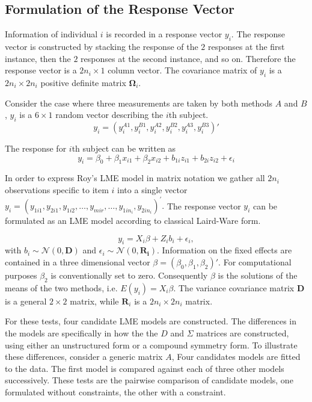 \documentclass[12pt, a4paper]{report}
\theoremstyle{plain}
\theoremstyle{definition}
\theoremstyle{remark}
\begin{document}
\subsection{Formulation of the Response Vector}
Information of individual $i$ is recorded in a response vector ${y}_{i}$. The response vector is constructed by stacking the response of the $2$ responses at the first instance, then the $2$ responses at the second instance, and so on. Therefore the response vector is a $2n_{i} \times 1$ column vector.
The covariance matrix of ${y_{i}}$ is a $2n_{i} \times 2n_{i}$ positive definite matrix $\boldsymbol{\Omega}_{i}$.

Consider the case where three measurements are taken by both methods $A$ and $B$, ${y}_{i}$ is a $6 \times 1$ random vector describing the $i$th subject.
\[
{y}_{i} = (y_{i}^{A1},y_{i}^{B1},y_{i}^{A2},y_{i}^{B2},y_{i}^{A3},y_{i}^{B3}) \prime
\]

The response for $i$th subject can be written as
\[ y_i = \beta_0 + \beta_1x_{i1} + \beta_2x_{i2} + b_{1i}z_{i1}  + b_{2i}z_{i2} + \epsilon_i \]

In order to express Roy's LME model in matrix notation we gather all $2n_i$ observations specific to item $i$ into a single vector  ${y}_{i} = (y_{1i1},y_{2i1},y_{1i2},\ldots,y_{mir},\ldots,y_{1in_{i}},y_{2in_{i}})^\prime.$
The response vector ${y_{i}}$ can be formulated as an LME model according to classical Laird-Ware form.

\begin{equation}
{y_{i}} = {X_{i}\beta}  + {Z_{i}b_{i}} + {\epsilon_{i}},
\end{equation}
with ${b_{i}} \sim \mathcal{N}({0,\boldsymbol{D}})$ and 
${\epsilon_{i}} \sim \mathcal{N}({0,\boldsymbol{R_{i}}})$.
Information on the fixed effects are contained in a three dimensional vector ${\beta} = (\beta_{0},\beta_{1},\beta_{2})\prime$. For computational purposes $\beta_{2}$ is conventionally set to zero. Consequently ${\beta}$ is the solutions of the means of the two methods, i.e. $E({y}_{i})  = {X}_{i}{\beta}$. The variance covariance matrix $\boldsymbol{D}$ is a general $2 \times 2$ matrix, while $\boldsymbol{R}_{i}$ is a $2n_{i} \times 2n_{i}$ matrix.





For these tests, four candidate LME models are constructed. The differences in the models are specifically in how the the $D$ and $\Sigma$ matrices are constructed, using either an unstructured form or a compound symmetry form. To illustrate these differences, consider a generic matrix $A$,
Four candidates models are fitted to the data. The first model is compared against each of three other models successively. These tests are the pairwise comparison of candidate models, one formulated without constraints, the other with a constraint.
\end{document}
